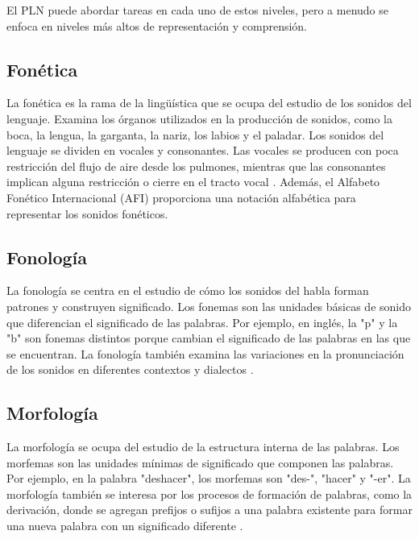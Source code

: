\documentclass{book}
\begin{document}
El PLN puede abordar tareas en cada uno de estos niveles, pero a menudo se enfoca en niveles más altos de representación y comprensión.




\subsection{Fonética}

La fonética es la rama de la lingüística que se ocupa del estudio de los sonidos del lenguaje. Examina los órganos utilizados en la producción de sonidos, como la boca, la lengua, la garganta, la nariz, los labios y el paladar. Los sonidos del lenguaje se dividen en vocales y consonantes. Las vocales se producen con poca restricción del flujo de aire desde los pulmones, mientras que las consonantes implican alguna restricción o cierre en el tracto vocal \cite{JohnsonMLSS, fromkin2018introduction}. Además, el Alfabeto Fonético Internacional (AFI) proporciona una notación alfabética para representar los sonidos fonéticos.

\subsection{Fonología}

La fonología se centra en el estudio de cómo los sonidos del habla forman patrones y construyen significado. Los fonemas son las unidades básicas de sonido que diferencian el significado de las palabras. Por ejemplo, en inglés, la "p" y la "b" son fonemas distintos porque cambian el significado de las palabras en las que se encuentran. La fonología también examina las variaciones en la pronunciación de los sonidos en diferentes contextos y dialectos \cite{fromkin2018introduction}.

\subsection{Morfología}

La morfología se ocupa del estudio de la estructura interna de las palabras. Los morfemas son las unidades mínimas de significado que componen las palabras. Por ejemplo, en la palabra "deshacer", los morfemas son "des-", "hacer" y "-er". La morfología también se interesa por los procesos de formación de palabras, como la derivación, donde se agregan prefijos o sufijos a una palabra existente para formar una nueva palabra con un significado diferente \cite{JohnsonMLSS}.
\end{document}
